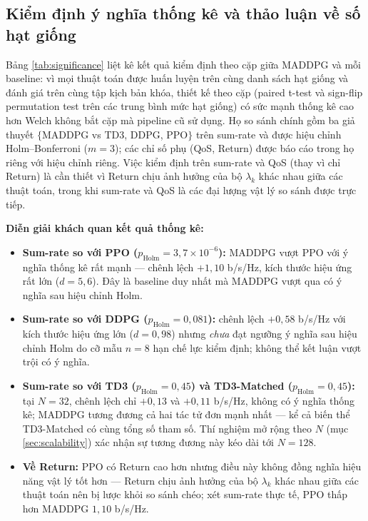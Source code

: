 \subsection{Kiểm định ý nghĩa thống kê và thảo luận về số hạt giống}

Bảng \ref{tab:significance} liệt kê kết quả kiểm định theo cặp giữa
MADDPG và mỗi baseline: vì mọi thuật toán được huấn luyện trên cùng
danh sách hạt giống và đánh giá trên cùng tập kịch bản khóa, thiết kế
theo cặp (paired t-test và sign-flip permutation test trên các trung
bình mức hạt giống) có sức mạnh thống kê cao hơn Welch không bắt cặp
mà pipeline cũ sử dụng. Họ so sánh chính gồm ba giả thuyết
$\{$MADDPG vs TD3, DDPG, PPO$\}$ trên sum-rate và được hiệu chỉnh
Holm--Bonferroni ($m=3$); các chỉ số phụ (QoS, Return) được báo cáo
trong họ riêng với hiệu chỉnh riêng. Việc kiểm định trên sum-rate và
QoS (thay vì chỉ Return) là cần thiết vì Return chịu ảnh hưởng của bộ
$\lambda_k$ khác nhau giữa các thuật toán, trong khi sum-rate và QoS
là các đại lượng vật lý so sánh được trực tiếp.



\textbf{Diễn giải khách quan kết quả thống kê:}
\begin{itemize}[leftmargin=*]
\item \textbf{Sum-rate so với PPO ($p_{\text{Holm}} = 3{,}7 \times 10^{-6}$):}
MADDPG vượt PPO với ý nghĩa thống kê rất mạnh --- chênh lệch $+1{,}10$
b/s/Hz, kích thước hiệu ứng rất lớn ($d = 5{,}6$). Đây là baseline duy
nhất mà MADDPG vượt qua có ý nghĩa sau hiệu chỉnh Holm.
\item \textbf{Sum-rate so với DDPG ($p_{\text{Holm}} = 0{,}081$):} chênh
lệch $+0{,}58$ b/s/Hz với kích thước hiệu ứng lớn ($d = 0{,}98$) nhưng
\emph{chưa} đạt ngưỡng ý nghĩa sau hiệu chỉnh Holm do cỡ mẫu $n=8$ hạn
chế lực kiểm định; không thể kết luận vượt trội có ý nghĩa.
\item \textbf{Sum-rate so với TD3 ($p_{\text{Holm}} = 0{,}45$) và
TD3-Matched ($p_{\text{Holm}} = 0{,}45$):} tại $N=32$, chênh lệch chỉ
$+0{,}13$ và $+0{,}11$ b/s/Hz, không có ý nghĩa thống kê; MADDPG tương
đương cả hai tác tử đơn mạnh nhất --- kể cả biến thể TD3-Matched có
cùng tổng số tham số. Thí nghiệm mở rộng theo $N$ (mục
\ref{sec:scalability}) xác nhận sự tương đương này kéo dài tới $N=128$.
\item \textbf{Về Return:} PPO có Return cao hơn nhưng điều này không
đồng nghĩa hiệu năng vật lý tốt hơn --- Return chịu ảnh hưởng của bộ
$\lambda_k$ khác nhau giữa các thuật toán nên bị lược khỏi so sánh chéo;
xét sum-rate thực tế, PPO thấp hơn MADDPG $1{,}10$ b/s/Hz.
\end{itemize}


